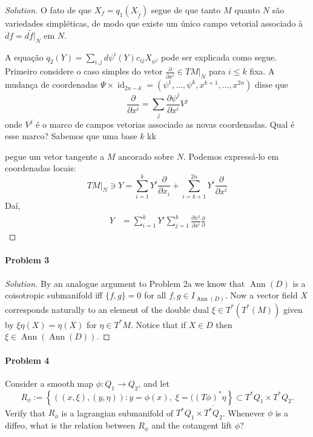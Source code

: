 \begin{proof}[Solution]
	O fato de que $X_f=q_1(X_{\tilde{f}})$ segue de que tanto $M$ quanto $N$ s\~ao variedades simpl\'eticas, de modo que existe um \'unico campo vetorial associado à  $df=d\tilde{f}|_{N}$ em $N$.

A equa\c c\~ao $q_2(Y)=\sum_{i,j}d\psi^i(Y)c_{ij}X_{\psi^j}$ pode ser explicada como segue. Primeiro considere o caso simples do vetor $\frac{\partial }{\partial x^i}\in TM|_{N}$ para $i\leq k$ fixa. A mudança de coordenadas $\Psi\times \operatorname{id}_{2n-k}=(\psi^1,\ldots,\psi^k,x^{k+1},\ldots,x^{2n})$ disse que
\[\frac{\partial }{\partial x^i}=\sum_{j}\frac{\partial \psi^j}{\partial x^i}V^j\]
onde $V^j$ \'e o marco de campos vetorias associado as novas coordenadas. Qual \'e esse marco? Sabemos que uma base $k$ kk


pegue um vetor tangente a $M$ ancorado sobre $N$. Podemos expressá-lo em coordenadas locais:
\[TM|_{N}\ni Y=\sum_{i=1}^kY^i\frac{\partial }{\partial x_i}+\sum_{i=k+1}^{2n}Y^i\frac{\partial }{\partial x^i}\]
Da\'i, \begin{align*}
	Y&=\sum_{i=1}^kY^i\sum_{j=1}^k\frac{\partial \psi^j}{\partial x^i}\frac{\partial }{\partial }
\end{align*}
\end{proof}

\paragraph{Problem 3}

\begin{proof}[Solution]\leavevmode
	By an analogue argument to Problem 2a we know that $\operatorname{Ann}(D)$ is a coisotropic submanifold iff $\{f,g\} =0$ for all $f,g\in I_{\operatorname{Ann}(D)}$. Now a vector field $X$ corresponds naturally to an element of the double dual $\xi \in T^*(T^*(M))$ given by $\xi\eta(X)=\eta(X)$ for  $\eta\in T^*M$. Notice that if $X \in D$ then $\xi \in \operatorname{Ann}(\operatorname{Ann}(D) ) $.
\end{proof}

\paragraph{Problem 4} Consider a smooth map $\phi:Q_1\to Q_2$, and let
\[R_{\phi}:=\left\{ \left( (x,\xi),(y,\eta) \right) :y=\phi(x),\;\xi=((T\phi)^*\eta \right\} \subset T^*Q_1\times T^*Q_2.\]
Verify that $R_\phi$ is a lagrangian submanifold of $T^* Q_1\times \overline{T^*Q_2}$. Whenever $\phi$ is a diffeo, what is the relation between $R_\phi$ and the cotangent lift $\hat{\phi}$?

